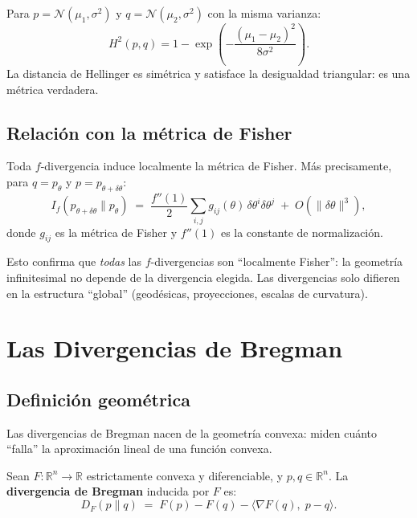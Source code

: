 \begin{example}
	Para $p = \mathcal{N}(\mu_1, \sigma^2)$ y $q = \mathcal{N}(\mu_2, \sigma^2)$ con la misma varianza:
	\[
	H^2(p, q) = 1 - \exp\!\left(-\frac{(\mu_1 - \mu_2)^2}{8\sigma^2}\right).
	\]
	La distancia de Hellinger es simétrica y satisface la desigualdad triangular: es una métrica verdadera.
\end{example}

\subsection{Relación con la métrica de Fisher}

\begin{theorem}
	Toda $f$-divergencia induce localmente la métrica de Fisher.  Más precisamente, para $q = p_\theta$ y $p = p_{\theta + \delta\theta}$:
	\[
	I_f(p_{\theta+\delta\theta} \| p_\theta) \;=\; \frac{f''(1)}{2} \sum_{i,j} g_{ij}(\theta)\, \delta\theta^i \delta\theta^j \;+\; O(\|\delta\theta\|^3),
	\]
	donde $g_{ij}$ es la métrica de Fisher y $f''(1)$ es la constante de normalización.
\end{theorem}

Esto confirma que \emph{todas} las $f$-divergencias son ``localmente Fisher'': la geometría infinitesimal no depende de la divergencia elegida.  Las divergencias solo difieren en la estructura ``global'' (geodésicas, proyecciones, escalas de curvatura).

\section{Las Divergencias de Bregman}

\subsection{Definición geométrica}

Las divergencias de Bregman nacen de la geometría convexa: miden cuánto ``falla'' la aproximación lineal de una función convexa.

\begin{definition}
	Sean $F: \mathbb{R}^n \to \mathbb{R}$ estrictamente convexa y diferenciable, y $p, q \in \mathbb{R}^n$.  La \textbf{divergencia de Bregman} inducida por $F$ es:
	\[
	D_F(p \| q) \;=\; F(p) - F(q) - \langle \nabla F(q),\; p - q \rangle.
	\]
\end{definition}

